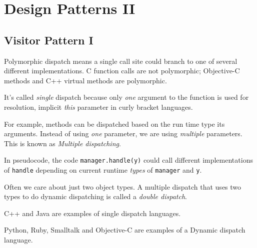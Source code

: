 
\chapter{Design Patterns II}



\section{Visitor Pattern I}

Polymorphic dispatch means a single call site could branch to one of several different implementations. 
C function calls are not polymorphic; Objective-C methods and C++ virtual methods are polymorphic.








It's called \textit{single} dispatch because only \textit{one} argument to the function is used
for resolution, implicit \textit{this} parameter in curly bracket languages.



For example, methods can be dispatched based on the run time type its arguments. 
Instead of using  \textit{one} parameter, we are using \textit{multiple} parameters.
This is known as \textit{Multiple dispatching}.


In pseudocode, the code \lstinline{manager.handle(y)} could call different 
implementations of \lstinline{handle} depending on current runtime 
\textit{types} of \lstinline{manager} and \lstinline{y}. 

Often we care about just two object types. A multiple dispatch that 
uses two types to do dynamic dispatching is called a \textit{double dispatch}. 






C++ and Java are examples of single dispatch languages. 

Python, Ruby, Smalltalk and Objective-C are examples of a Dynamic dispatch language.

\frmrule

